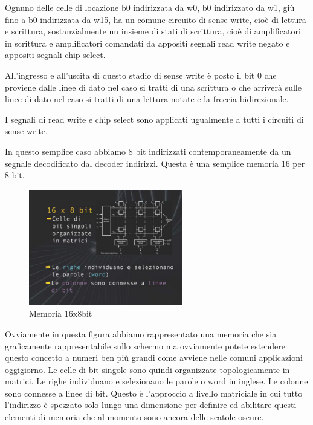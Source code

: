 Ognuno delle celle di locazione b0 indirizzata da w0, b0 indirizzato da w1, giù fino a b0 indirizzata da w15, ha un comune circuito di sense write, cioè di lettura e scrittura, sostanzialmente un insieme di stati di scrittura, cioè di amplificatori in scrittura e amplificatori comandati da appositi segnali read write negato e appositi segnali chip select.

All'ingresso e all'uscita di questo stadio di sense write è posto il bit 0 che proviene dalle linee di dato nel caso si tratti di una scrittura o che arriverà sulle linee di dato nel caso si tratti di una lettura notate e la freccia bidirezionale.

I segnali di read write e chip select sono applicati ugualmente a tutti i circuiti di sense write.

In questo semplice caso abbiamo 8 bit indirizzati contemporaneamente da un segnale decodificato dal decoder indirizzi. Questa è una semplice memoria 16 per 8 bit.

\FloatBarrier
\begin{figure}[H]
  \centering
  \includegraphics[width=0.60\textwidth,
                    trim=40 40 10 40, %
                    clip]
                    {images/Lez04_p01_fig_06.png}
  \caption{Memoria 16x8bit}
  \label{fig:Lez04_p01_fig_06}
\end{figure}
\FloatBarrier
\noindent

Ovviamente in questa figura abbiamo rappresentato una memoria che sia graficamente rappresentabile sullo schermo ma ovviamente potete estendere questo concetto a numeri ben più grandi come avviene nelle comuni applicazioni oggigiorno.
Le celle di bit singole sono quindi organizzate topologicamente in matrici.
Le righe individuano e selezionano le parole o word in inglese.
Le colonne sono connesse a linee di bit.
Questo è l'approccio a livello matriciale in cui tutto l'indirizzo è spezzato solo lungo una dimensione per definire ed abilitare questi elementi di memoria che al momento sono ancora delle scatole oscure.

